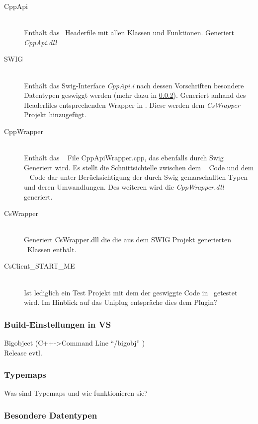 \begin{description}
\item[CppApi]\hfill \\
Enthält das \CC~Headerfile mit allen Klassen und Funktionen. Generiert \emph{CppApi.dll}
\item[SWIG]\hfill \\
Enthält das Swig-Interface \emph{CppApi.i} nach dessen Vorschriften besondere Datentypen geswiggt werden (mehr dazu in \ref{subsubsec:Typemaps}). Generiert anhand des Headerfiles entsprechenden Wrapper in \CS. Diese werden dem \emph{CsWrapper} Projekt hinzugefügt.
\item[CppWrapper]\hfill \\
Enthält das \CC~ File CppApiWrapper.cpp, das ebenfalls durch Swig Generiert wird. Es stellt die Schnittsichtelle zwischen dem \CC~ Code und dem \CS~ Code dar unter Berücksichtigung der durch Swig gemarschallten Typen und deren Umwandlungen. Des weiteren wird die \emph{CppWrapper.dll} generiert. 
\item[CsWrapper]\hfill \\
Generiert CsWrapper.dll die die aus dem SWIG Projekt generierten \CS~Klassen enthält. 
\item[CsClient\_START\_ME]\hfill \\
Ist lediglich ein Test Projekt mit dem der geswiggte Code in \CS~getestet wird. Im Hinblick auf das Uniplug entspräche dies dem Plugin?
\end{description}

  

\subsubsection{Build-Einstellungen in VS}\label{subsubsec:Build}
	Bigobject (C++->Command Line "`/bigobj"' )\\
	Release evtl.


\subsubsection{Typemaps}\label{subsubsec:Typemaps}

Was sind Typemaps und wie funktionieren sie?\\

\subsubsection{Besondere Datentypen}\label{subsubsec:Datentypen}

